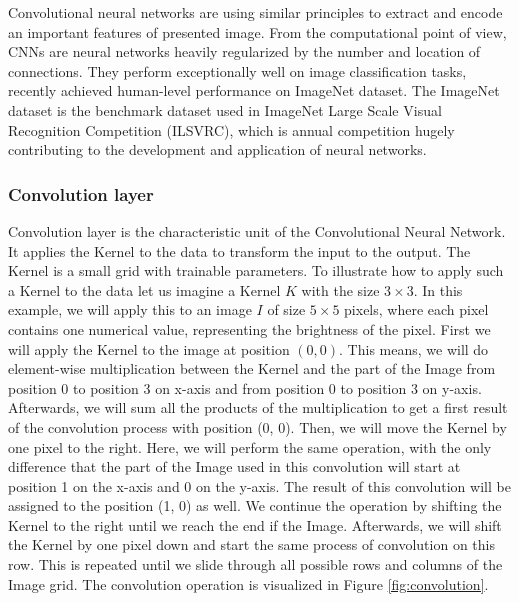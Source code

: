 Convolutional neural networks are using similar principles to extract and encode an important features of presented image.
From the computational point of view, CNNs are neural networks heavily regularized by the number and location of connections.
They perform exceptionally well on image classification tasks, recently achieved human-level performance on ImageNet dataset.
The ImageNet dataset is the benchmark dataset used in ImageNet Large Scale Visual Recognition Competition (ILSVRC), which is annual competition hugely contributing to the development and application of neural networks.

\subsubsection{Convolution layer}
Convolution layer is the characteristic unit of the Convolutional Neural Network.
It applies the Kernel to the data to transform the input to the output.
The Kernel is a small grid with trainable parameters.
To illustrate how to apply such a Kernel to the data let us imagine a Kernel $K$ with the size $3 \times 3$.
In this example, we will apply this to an image $I$ of size $5 \times 5$ pixels, where each pixel contains one numerical value, representing the brightness of the pixel.
First we will apply the Kernel to the image at position $(0, 0)$.
This means, we will do element-wise multiplication between the Kernel and the part of the Image from position 0 to position 3 on x-axis and from position 0 to position 3 on y-axis.
Afterwards, we will sum all the products of the multiplication to get a first result of the convolution process with position (0, 0).
Then, we will move the Kernel by one pixel to the right.
Here, we will perform the same operation, with the only difference that the part of the Image used in this convolution will start at position 1 on the x-axis and 0 on the y-axis.
The result of this convolution will be assigned to the position (1, 0) as well.
We continue the operation by shifting the Kernel to the right until we reach the end if the Image.
Afterwards, we will shift the Kernel by one pixel down and start the same process of convolution on this row.
This is repeated until we slide through all possible rows and columns of the Image grid.
The convolution operation is visualized in Figure \ref{fig:convolution}.

